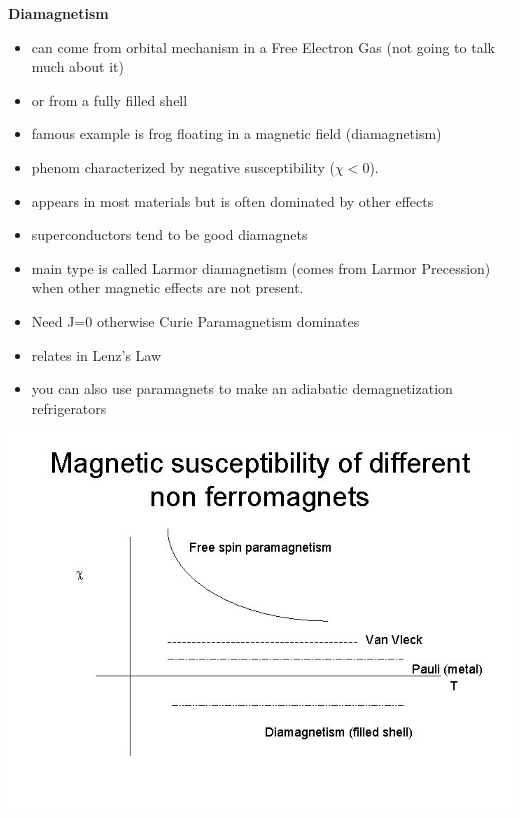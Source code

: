 \textbf{Diamagnetism}
\begin{itemize}
    \item can come from orbital mechanism in a Free Electron Gas (not going to talk much about it)
    \item or from a fully filled shell
    \item famous example is frog floating in a magnetic field (diamagnetism)
    \item phenom characterized by negative susceptibility ($\chi<0$).
    \item appears in most materials but is often dominated by other effects
    \item superconductors tend to be good diamagnets
    \item main type is called Larmor diamagnetism (comes from Larmor Precession) when other magnetic effects are not present.
    \item Need J=0 otherwise Curie Paramagnetism dominates
    \item relates in Lenz's Law
    \item you can also use paramagnets to make an adiabatic demagnetization refrigerators
\end{itemize}


\includegraphics[width = \linewidth]{Images/paramagnetism.jpg}

